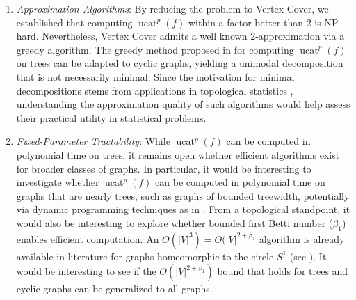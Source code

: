 \documentclass[11pt]{article}
\DeclareMathOperator{\ucat}{ucat}
\begin{document}
\begin{enumerate}
\item \textit{Approximation Algorithms}: By reducing the problem to Vertex Cover, we established that computing $\ucat^p(f)$ within a factor better than 2 is NP-hard. Nevertheless, Vertex Cover admits a well known 2-approximation via a greedy algorithm. The greedy method proposed in \cite{Bar20} for computing $\ucat^p(f)$ on trees can be adapted to cyclic graphs, yielding a unimodal decomposition that is not necessarily minimal. Since the motivation for minimal decompositions stems from applications in topological statistics \cite{baryshnikov_unimodal_2011}, understanding the approximation quality of such algorithms would help assess their practical utility in statistical problems.

\item \textit{Fixed-Parameter Tractability}: While $\ucat^p(f)$ can be computed in polynomial time on trees, it remains open whether efficient algorithms exist for broader classes of graphs. In particular, it would be interesting to investigate whether $\ucat^p(f)$ can be computed in polynomial time on graphs that are nearly trees, such as graphs of bounded treewidth, potentially via dynamic programming techniques as in \cite{bodlaender88}. From a topological standpoint, it would also be interesting to explore whether bounded first Betti number ($\beta_1$) enables efficient computation. An $O(|V|^3)=O(|V|^{2+\beta_1}$ algorithm is already available in literature for graphs homeomorphic to the circle $S^1$ (see \cite{Gov21}). It would be interesting to see if the $O(|V|^{2+\beta_1})$ bound that holds for trees and cyclic graphs can be generalized to all graphs.

\end{enumerate}



\end{document}
